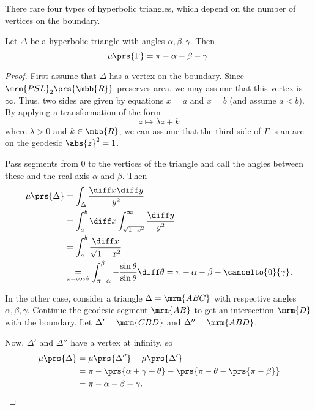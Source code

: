 \documentclass[10pt, twoside]{book}
\begin{document}
\begin{example}
There rare four types of hyperbolic triangles, which depend on the number of vertices on the boundary.
\end{example}

\begin{theorem}
Let $\Delta$ be a hyperbolic triangle with angles $\alpha,\beta,\gamma$. Then
\[\mu\prs{\Gamma} = \pi - \alpha - \beta - \gamma \text{.}\]
\end{theorem}

\begin{proof}
First assume that $\Delta$ has a vertex on the boundary. Since $\mrm{PSL}_2\prs{\mbb{R}}$ preserves area, we may assume that this vertex is $\infty$.
Thus, two sides are given by equations $x = a$ and $x = b$ (and assume $a < b$).
By applying a transformation of the form
\[z \mapsto \lambda z + k\]
where $\lambda > 0$ and $k \in \mbb{R}$, we can assume that the third side of $\Gamma$ is an arc on the geodesic $\abs{z}^2 = 1$.

Pass segments from $0$ to the vertices of the triangle and call the angles between these and the real axis $\alpha$ and $\beta$.
Then
\begin{align*}
\mu\prs{\Delta} &=
\int_\Delta \frac{\diff x \diff y}{y^2}
\\&=
\int_a^b \diff x \int_{\sqrt{1 - x^2}}^\infty \frac{\diff y}{y^2}
\\&=
\int_a^b \frac{\diff x}{\sqrt{1 - x^2}}
\\&\underset{x = \cos\theta}{=}
\int_{\pi - \alpha}^\beta - \frac{\sin \theta}{\sin \theta} \diff \theta = \pi - \alpha - \beta - \cancelto{0}{\gamma} \text{.}
\end{align*}

In the other case, consider a triangle $\Delta = \mrm{ABC}$ with respective angles $\alpha,\beta,\gamma$. Continue the geodesic segment $\mrm{AB}$ to get an intersection $\mrm{D}$ with the boundary.
Let $\Delta' = \mrm{CBD}$ and $\Delta'' = \mrm{ABD}$.


Now, $\Delta'$ and $\Delta''$ have a vertex at infinity, so
\begin{align*}
\mu\prs{\Delta} &= \mu\prs{\Delta''} - \mu\prs{\Delta'}
\\&=
\pi - \prs{\alpha + \gamma + \theta} - \prs{\pi - \theta - \prs{\pi - \beta}}
\\&= \pi - \alpha - \beta - \gamma \text{.}
\end{align*}
\end{proof}
\end{document}
